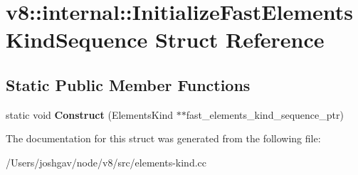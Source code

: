 \hypertarget{structv8_1_1internal_1_1_initialize_fast_elements_kind_sequence}{}\section{v8\+:\+:internal\+:\+:Initialize\+Fast\+Elements\+Kind\+Sequence Struct Reference}
\label{structv8_1_1internal_1_1_initialize_fast_elements_kind_sequence}
\subsection*{Static Public Member Functions}
\begin{DoxyCompactItemize}
\item 
static void {\bfseries Construct} (Elements\+Kind $\ast$$\ast$fast\+\_\+elements\+\_\+kind\+\_\+sequence\+\_\+ptr)\hypertarget{structv8_1_1internal_1_1_initialize_fast_elements_kind_sequence_a38d945d0d5dd0ca49928625e503b7db4}{}\label{structv8_1_1internal_1_1_initialize_fast_elements_kind_sequence_a38d945d0d5dd0ca49928625e503b7db4}

\end{DoxyCompactItemize}


The documentation for this struct was generated from the following file\+:\begin{DoxyCompactItemize}
\item 
/\+Users/joshgav/node/v8/src/elements-\/kind.\+cc\end{DoxyCompactItemize}
